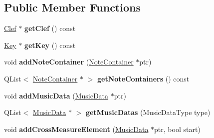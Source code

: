 \subsection*{Public Member Functions}
\begin{DoxyCompactItemize}
\item 
\mbox{\label{class_o_v_e_1_1_measure_data_a1c64dc7ab93bd73ff0925ac182aa49bd}} 
\hyperlink{class_o_v_e_1_1_clef}{Clef} $\ast$ {\bfseries get\+Clef} () const
\item 
\mbox{\label{class_o_v_e_1_1_measure_data_a43848f52995528f924a17b136308b8ce}} 
\hyperlink{class_o_v_e_1_1_key}{Key} $\ast$ {\bfseries get\+Key} () const
\item 
\mbox{\label{class_o_v_e_1_1_measure_data_aa83bc2ebac36f23c941235ba450fe763}} 
void {\bfseries add\+Note\+Container} (\hyperlink{class_o_v_e_1_1_note_container}{Note\+Container} $\ast$ptr)
\item 
\mbox{\label{class_o_v_e_1_1_measure_data_a34c126514e41811f70d6ba58b760b6b0}} 
Q\+List$<$ \hyperlink{class_o_v_e_1_1_note_container}{Note\+Container} $\ast$ $>$ {\bfseries get\+Note\+Containers} () const
\item 
\mbox{\label{class_o_v_e_1_1_measure_data_a562f53fe215f83237e9e2946225be5a1}} 
void {\bfseries add\+Music\+Data} (\hyperlink{class_o_v_e_1_1_music_data}{Music\+Data} $\ast$ptr)
\item 
\mbox{\label{class_o_v_e_1_1_measure_data_a9bd374e5969196c57fcd01e78253c915}} 
Q\+List$<$ \hyperlink{class_o_v_e_1_1_music_data}{Music\+Data} $\ast$ $>$ {\bfseries get\+Music\+Datas} (Music\+Data\+Type type)
\item 
\mbox{\label{class_o_v_e_1_1_measure_data_a701b7022c11b63515a44f7719e1d1ced}} 
void {\bfseries add\+Cross\+Measure\+Element} (\hyperlink{class_o_v_e_1_1_music_data}{Music\+Data} $\ast$ptr, bool start)
\item 
\mbox{\label{class_o_v_e_1_1_measure_data_a07bc1ca8331a07c390555c7aabe0a07c}} 

\end{DoxyCompactItemize}
